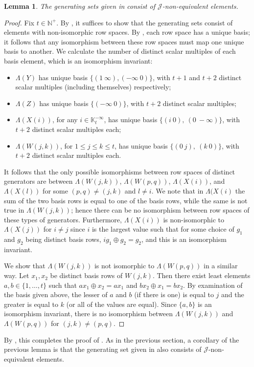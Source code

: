 \documentclass[11pt]{article}
\newtheorem{lemma}[thm]{Lemma}
\numberwithin{equation}{section}
\newcommand{\J}{\mathscr{J}}
\newcommand{\N}{\mathbb{N}}
\newcommand{\Np}{\N^{+}}
\newcommand{\K}{\mathbb{K}}
\newcommand{\Kmaxt}{\K^{-\infty}_t}
\newcommand{\RowS}{\Lambda}
\begin{document}
\begin{lemma}
  The generating sets given in  consist of
  $\J$-non-equivalent elements.
\end{lemma}
\begin{proof}
  Fix $t \in \Np$. By , it suffices to show that the
generating sets consist of elements with non-isomorphic row spaces. By
, each row space has a unique basis; it
follows that any isomorphism between these row spaces must map one unique basis
to another. We calculate the number of distinct scalar multiples of each basis
element, which is an isomorphism invariant:

\begin{itemize}
  \item 
    $\RowS(Y)$ has unique basis $\{(1~\infty), (-\infty~0)\}$, with $t + 1$ and
    $t + 2$ distinct scalar multiples (including themselves) respectively;
  \item
    $\RowS(Z)$ has unique basis $\{(-\infty~0)\}$, with $t + 2$ distinct scalar
    multiples;
  \item
    $\RowS(X(i))$, for any $i \in \Kmaxt$, has unique basis
    $\{(i~0),~(0~-\infty)\}$, with $t + 2$ distinct scalar multiples each;
  \item $\RowS(W(j, k))$, for $1 \leq j \leq k \leq t$, has unique basis
    $\{(0~j),~(k~0)\}$, with $t + 2$ distinct scalar multiples each.
\end{itemize}
It follows that the only possible isomorphisms between row spaces of distinct
generators are between $\RowS(W(j, k))$, $\RowS(W(p, q))$, $\RowS(X(i))$, and
$\RowS(X(l))$ for some $(p, q) \neq (j, k)$ and $l \neq i$. We note that in
$\RowS(X(i)$ the sum of the two basis rows is equal to one of the basis rows,
while the same is not true in $\RowS(W(j, k))$; hence there can be no
isomorphism between row spaces of these types of generators. Furthermore,
$\RowS(X(i))$ is non-isomorphic to $\RowS(X(j))$ for $i \neq j$ since $i$ is the
largest value such that for some choice of $g_1$ and $g_2$ being distinct basis
rows, $ig_1 \oplus g_2 = g_2$, and this is an isomorphism invariant.

We show that $\RowS(W(j, k))$ is not isomorphic to $\RowS(W(p, q))$ in a similar
way. Let $x_1, x_2$ be distinct basis rows of $W(j, k)$. Then there exist least
elements $a, b \in \{1, \ldots, t\}$ such that $ax_1 \oplus x_2 = ax_1$ and
$bx_2 \oplus x_1 = bx_2$. By examination of the basis given above, the lesser of
$a$ and $b$ (if there is one) is equal to $j$ and the greater is equal to $k$
(or all of the values are equal). Since $\{a, b\}$ is an isomorphism invariant,
there is no isomorphism between $\RowS(W(j, k))$ and $\RowS(W(p, q))$ for $(j,
k) \neq (p, q)$.
\end{proof}
By , this completes the proof of
. As in the previous section, a corollary of the
previous lemma is that the generating set given in 
also consists of $\J$-non-equivalent elements.
\end{document}
